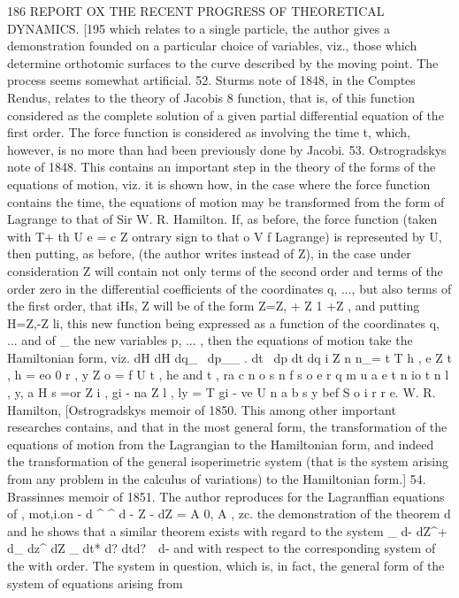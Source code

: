 \documentclass[12pt,a4paper]{article}
\theoremstyle{definition}
\begin{document}
186 REPORT OX THE RECENT PROGRESS OF THEORETICAL DYNAMICS.
[195
which relates to a single particle, the author gives a demonstration founded on a
particular choice of variables, viz., those which determine orthotomic surfaces to the
curve described by the moving point. The process seems somewhat artificial.
52. Sturms note of 1848, in the Comptes Rendus, relates to the theory of Jacobis
8 function, that is, of this function considered as the complete solution of a given
partial differential equation of the first order. The force function is considered as
involving the time t, which, however, is no more than had been previously done by
Jacobi.
53. Ostrogradskys note of 1848. This contains an important step in the theory
of the forms of the equations of motion, viz. it is shown how, in the case where the
force function contains the time, the equations of motion may be transformed from the
form of Lagrange to that of Sir W. R. Hamilton. If, as before, the force function
(taken with T+ th U e = c Z ontrary sign to that o V f Lagrange) is represented by U, then putting,
as before, (the author writes instead of Z), in the case under consideration
Z
will contain not only terms of the second order and terms of the order zero in the
differential coefficients of the coordinates q, ..., but also terms of the first order, that
iHs, Z will be of the form Z=Z, + Z 1 +Z , and putting H=Z,-Z li, this new function
being expressed as a function of the coordinates q, ... and of _ the new variables
p, ... , then the equations of motion take the Hamiltonian form, viz.
dH dH
dq_~ dp__
.
dt ~dp dt dq
i Z n n_= t T h , e Z t , h = eo 0 r , y Z o = f U t , he and t , ra c n o s n f s o e r q m u a e t n io t n l , y, a H s =or Z i , gi - na Z l , ly = T gi - ve U n a b s y bef S o i r r e. W. R. Hamilton,
[Ostrogradskys memoir of 1850. This among other important researches contains,
and that in the most general form, the transformation of the equations of motion
from the Lagrangian to the Hamiltonian form, and indeed the transformation of the
general isoperimetric system (that is the system arising from any problem in the
calculus of variations) to the Hamiltonian form.]
54. Brassinnes memoir of 1851. The author reproduces for the Lagranffian
equations of , mot,i.on - d ^ ^ d - Z - dZ = A 0, A , zc. the demonstration of the theorem
d
and he shows that a similar theorem exists with regard to the system
_ d- dZ^+ d_ dz^ dZ _
dt* d? dtd?~~d-
and with respect to the corresponding system of the with order. The system in
question, which is, in fact, the general form of the system of equations arising from
\end{document}
